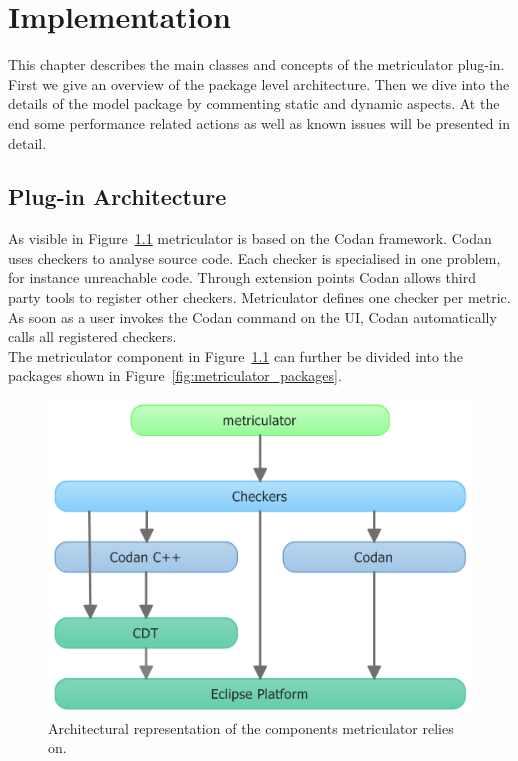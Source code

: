\documentclass[11pt,a4paper,oneside]{scrreprt}
\begin{document}
\chapter{Implementation}
This chapter describes the main classes and concepts of the metriculator plug-in. First we give an overview of the package level architecture. Then we dive into the details of the model package by commenting static and dynamic aspects. At the end some performance related actions as well as known issues will be presented in detail.

\section{Plug-in Architecture}
As visible in Figure~\ref{fig:cdt_codan_components_impl} metriculator is based on the Codan framework. Codan uses checkers to analyse source code. Each checker is specialised in one problem, for instance unreachable code. Through extension points Codan allows third party tools to register other checkers. Metriculator defines one checker per metric. As soon as a user invokes the Codan command on the UI, Codan automatically calls all registered checkers.\\
The metriculator component in Figure~\ref{fig:cdt_codan_components_impl} can further be divided into the packages shown in Figure~\ref{fig:metriculator_packages}.
\begin{figure}[th]
 \centering
 \includegraphics[scale=0.6]{figures/cdt_codan_components.png}
  \caption{Architectural representation of the components metriculator relies on.}
  \label{fig:cdt_codan_components_impl}
 \end{figure}
\end{document}
